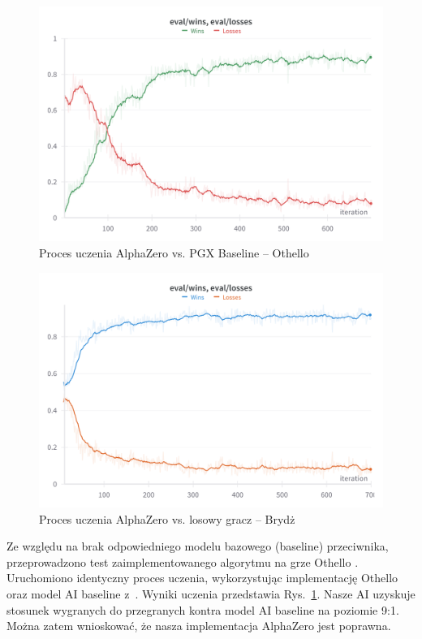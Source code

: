 \begin{figure}[h!]
  \centering
  \includegraphics[width=\textwidth]{img/wykresy/othello-eval.png}
  \caption{Proces uczenia AlphaZero vs. PGX Baseline -- Othello}
  \label{fig:othello-eval}
\end{figure}

\begin{figure}[!]
  \centering
  \includegraphics[width=\textwidth]{img/wykresy/bzero-eval.png}
  \caption{Proces uczenia AlphaZero vs. losowy gracz -- Brydż}
  \label{fig:bzero-eval}
\end{figure}

Ze względu na brak odpowiedniego modelu
bazowego (baseline) przeciwnika,
przeprowadzono test zaimplementowanego algorytmu
na grze Othello \cite{Othello}.
Uruchomiono identyczny proces uczenia,
wykorzystując implementację Othello oraz
model AI baseline z~\cite{PGX}.
Wyniki uczenia przedstawia Rys.~\ref{fig:othello-eval}.
Nasze AI uzyskuje stosunek wygranych do przegranych
kontra model AI baseline na poziomie 9:1.
Można zatem wnioskować, że nasza implementacja
AlphaZero jest poprawna.

